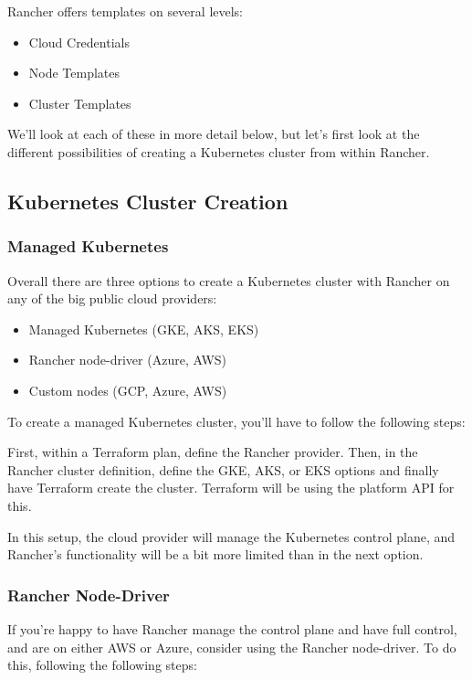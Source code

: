 Rancher offers templates on several levels:

\begin{itemize}
\item Cloud Credentials
\item Node Templates
\item Cluster Templates
\end{itemize}

We'll look at each of these in more detail below, but let's first look at the different possibilities of creating a Kubernetes cluster from within Rancher.

\subsection{Kubernetes Cluster Creation}

\subsubsection{Managed Kubernetes}

Overall there are three options to create a Kubernetes cluster with Rancher on any of the big public cloud providers:

\begin{itemize}
\item Managed Kubernetes (GKE, AKS, EKS)
\item Rancher node-driver (Azure, AWS)
\item Custom nodes (GCP, Azure, AWS)
\end{itemize}

To create a managed Kubernetes cluster, you'll have to follow the following steps:

First, within a  Terraform plan, define the Rancher provider. Then, in the Rancher cluster definition, define the GKE, AKS, or EKS options and finally have Terraform create the cluster. Terraform will be using the platform API for this.

In this setup, the cloud provider will manage the Kubernetes control plane, and Rancher's functionality will be a bit more limited than in the next option.

\subsubsection{Rancher Node-Driver}

If you're happy to have Rancher manage the control plane and have full control, and are on either AWS or Azure, consider using the Rancher node-driver. To do this, following the following steps:

